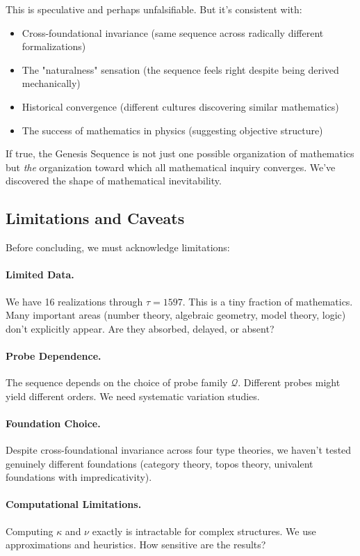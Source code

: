 \documentclass[11pt]{article}
\theoremstyle{definition}
\begin{document}
This is speculative and perhaps unfalsifiable. But it's consistent with:
\begin{itemize}
\item Cross-foundational invariance (same sequence across radically different formalizations)
\item The "naturalness" sensation (the sequence feels right despite being derived mechanically)
\item Historical convergence (different cultures discovering similar mathematics)
\item The success of mathematics in physics (suggesting objective structure)
\end{itemize}

If true, the Genesis Sequence is not just one possible organization of mathematics but \emph{the} organization toward which all mathematical inquiry converges. We've discovered the shape of mathematical inevitability.

\subsection{Limitations and Caveats}

Before concluding, we must acknowledge limitations:

\paragraph{Limited Data.}
We have 16 realizations through $\tau=1597$. This is a tiny fraction of mathematics. Many important areas (number theory, algebraic geometry, model theory, logic) don't explicitly appear. Are they absorbed, delayed, or absent?

\paragraph{Probe Dependence.}
The sequence depends on the choice of probe family $\mathcal{Q}$. Different probes might yield different orders. We need systematic variation studies.

\paragraph{Foundation Choice.}
Despite cross-foundational invariance across four type theories, we haven't tested genuinely different foundations (category theory, topos theory, univalent foundations with impredicativity).

\paragraph{Computational Limitations.}
Computing $\kappa$ and $\nu$ exactly is intractable for complex structures. We use approximations and heuristics. How sensitive are the results?
\end{document}
